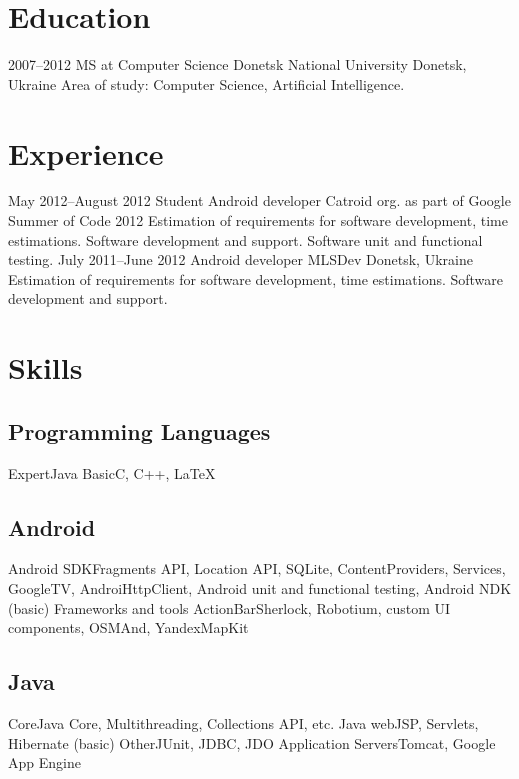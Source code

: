 \documentclass[11pt,a4paper]{moderncv}
\begin{document}
\makecvtitle

\section{Education}
\cventry
	{2007--2012}
	{MS at Computer Science}
	{Donetsk National University}
	{Donetsk, Ukraine}{}
	{Area of study: Computer Science, Artificial Intelligence.}

\section{Experience}
\cventry
	{May 2012--August 2012}
	{Student Android developer}
	{Catroid org. as part of Google Summer of Code 2012}
	{}
	{}
	{Estimation of requirements for software development, time estimations.
	\newline{} Software development and support.
	\newline{} Software unit and functional testing.}
\cventry
	{July 2011--June 2012}
	{Android developer}
	{MLSDev}
	{Donetsk, Ukraine}
	{}
	{Estimation of requirements for software development, time estimations.
	\newline{} Software development and support.}

\section{Skills}
\subsection{Programming Languages}
\cvline
  	{Expert}{Java}
\cvline
  	{Basic}{C, C++, LaTeX}
\subsection{Android}
\cvline
	{Android SDK}{Fragments API, Location API, SQLite, ContentProviders, Services, GoogleTV,
	\newline{} AndroiHttpClient, Android unit and functional testing, Android NDK (basic) }
\cvline 
	{Frameworks and tools} {ActionBarSherlock, Robotium, custom UI components, OSMAnd, YandexMapKit}
\subsection{Java}
\cvline
	{Core}{Java Core, Multithreading, Collections API, etc.}
\cvline
	{Java web}{JSP, Servlets, Hibernate (basic)}
\cvline
	{Other}{JUnit, JDBC, JDO}
\cvline
	{Application Servers}{Tomcat, Google App Engine}
\end{document}
